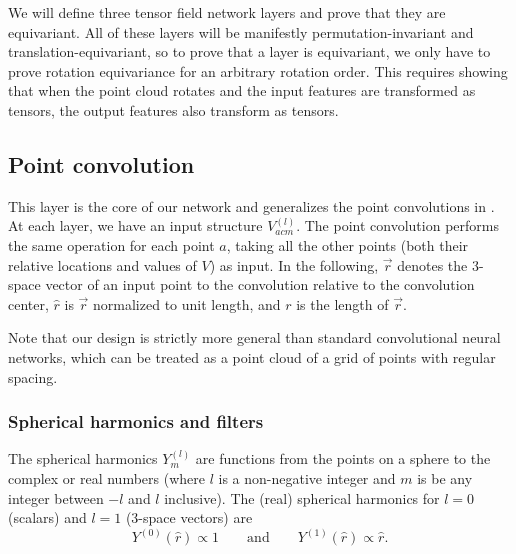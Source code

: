 \documentclass{article}
\begin{document}
We will define three tensor field network layers and prove that they are equivariant.  All of these layers will be manifestly permutation-invariant and translation-equivariant, so to prove that a layer is equivariant, we only have to prove rotation equivariance for an arbitrary rotation order.  This requires showing that when the point cloud rotates and the input features are transformed as tensors, the output features also transform as tensors.

\subsection{Point convolution}

This layer is the core of our network and generalizes the point convolutions in \citep{MD17Schutt2017}.
At each layer, we have an input structure $V^{(l)}_{acm}$. The point convolution performs the same operation for each point $a$, taking all the other points (both their relative locations and values of $V$) as input.
In the following, $\vec{r}$ denotes the 3-space vector of an input point to the convolution relative to the convolution center, $\hat{r}$ is $\vec{r}$ normalized to unit length, and $r$ is the length of $\vec{r}$.

Note that our design is strictly more general than standard convolutional neural networks, which can be treated as a point cloud %
of a grid of points with regular spacing.



\subsubsection{Spherical harmonics and filters}

The spherical harmonics $Y^{(l)}_m$ are functions from the points on a sphere to the complex or real numbers (where $l$ is a non-negative integer and $m$ is be any integer between $-l$ and $l$ inclusive). %
The (real) spherical harmonics for $l=0$ (scalars) and $l=1$ (3-space vectors) are 
\[Y^{(0)}(\hat{r}) \propto 1 \qquad \text{and} \qquad Y^{(1)}(\hat{r}) \propto \hat{r}.\]
\end{document}
